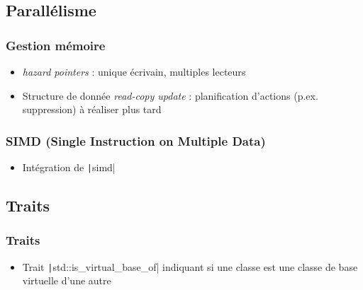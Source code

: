 \documentclass[C++.tex]{subfiles}
\begin{document}
\subsection*{Parallélisme}
\begin{frame}[fragile]
	\frametitle{Gestion mémoire}
	\begin{itemize}
		\item \textit{hazard pointers} : unique écrivain, multiples lecteurs
		\item Structure de donnée \textit{read-copy update} : planification d'actions (p.ex. suppression) à réaliser plus tard
	\end{itemize}

\end{frame}

\begin{frame}[fragile]
	\frametitle{SIMD (Single Instruction on Multiple Data)}
	\begin{itemize}
		\item Intégration de \texttt|simd|
	\end{itemize}

\end{frame}

\subsection*{Traits}
\begin{frame}[fragile]
	\frametitle{Traits}
	\begin{itemize}
		\item Trait \texttt|std::is_virtual_base_of| indiquant si une classe est une classe de base virtuelle d'une autre
	\end{itemize}

\end{frame}
\end{document}
